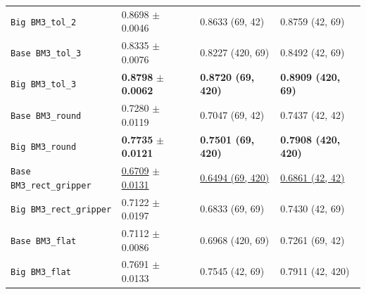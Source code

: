 \begin{table}[htbp]
\begin{tabular}{llll}
        \texttt{Big BM3\_tol\_2} & 0.8698 $\pm$ 0.0046 & 0.8633 (69, 42) & 0.8759 (42, 69) \\
        \texttt{Base BM3\_tol\_3} & 0.8335 $\pm$ 0.0076 & 0.8227 (420, 69) & 0.8492 (42, 69)\\
        \texttt{Big BM3\_tol\_3} & \textbf{0.8798} $\pm$ \textbf{0.0062} & \textbf{0.8720 (69, 420)} & \textbf{0.8909 (420, 69)} \\
        \midrule
        \texttt{Base BM3\_round} & 0.7280 $\pm$ 0.0119 & 0.7047 (69, 42) & 0.7437 (42, 42)\\
        \texttt{Big BM3\_round} & \textbf{0.7735} $\pm$ \textbf{0.0121} & \textbf{0.7501 (69, 420)} & \textbf{0.7908 (420, 420)} \\
        \texttt{Base BM3\_rect\_gripper} & \underline{0.6709} $\pm$ \underline{0.0131} & \underline{0.6494 (69, 420)} & \underline{0.6861 (42, 42)}\\
        \texttt{Big BM3\_rect\_gripper} & 0.7122 $\pm$ 0.0197 & 0.6833 (69, 69) & 0.7430 (42, 69) \\
        \texttt{Base BM3\_flat} & 0.7112 $\pm$ 0.0086 & 0.6968 (420, 69) & 0.7261 (69, 42)\\
        \texttt{Big BM3\_flat} & 0.7691 $\pm$ 0.0133 & 0.7545 (42, 69) & 0.7911 (42, 420) \\
        \bottomrule
    \end{tabular}
\end{table}

